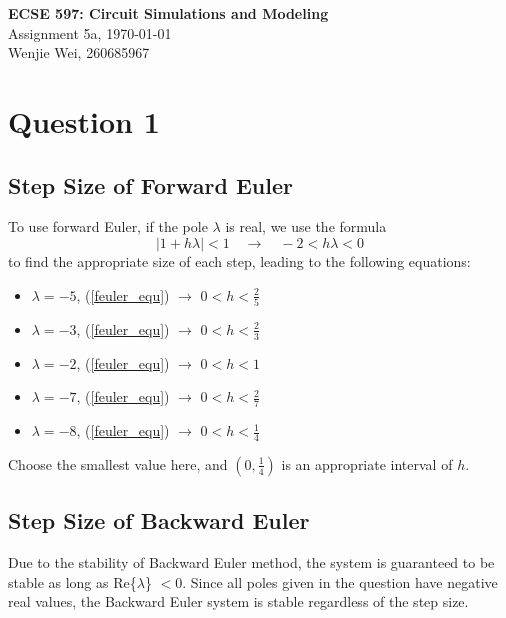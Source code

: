 \documentclass[a4paper,titlepage, 12pt]{article}
\begin{document}
	\sloppy	
	
	\begin{center}
		{\LARGE \bf ECSE 597: Circuit Simulations and Modeling}\\
		{\large Assignment 5a, \quad \today}\\
		{\large Wenjie Wei, 260685967}
	\end{center}

	\section{Question 1}
		\subsection{Step Size of Forward Euler}
			To use forward Euler, if the pole $\lambda$ is real, we use the formula 
			\begin{equation}
				|1 + h\lambda| < 1 \quad \rightarrow \quad -2 < h\lambda < 0
				\label{feuler_equ}
			\end{equation}
			to find the appropriate size of each step, leading to the following equations: 
			
			\begin{itemize}
				\item $\lambda = -5$, (\ref{feuler_equ}) $\rightarrow$ $0 < h < \frac{2}{5}$
								
				\item $\lambda = -3$, (\ref{feuler_equ}) $\rightarrow$ $0 < h < \frac{2}{3}$
				
				\item $\lambda = -2$, (\ref{feuler_equ}) $\rightarrow$ $0 < h < 1$
				
				\item $\lambda = -7$, (\ref{feuler_equ}) $\rightarrow$ $0 < h < \frac{2}{7}$
				
				\item $\lambda = -8$, (\ref{feuler_equ}) $\rightarrow$ $0 < h < \frac{1}{4}$
			\end{itemize}
		
			Choose the smallest value here, and $(0, \frac{1}{4})$ is an appropriate interval of $h$. 
			
		\subsection{Step Size of Backward Euler}
			Due to the stability of Backward Euler method, the system is guaranteed to be stable as long as Re\{$\lambda$\} $< 0$. Since all poles given in the question have negative real values, the Backward Euler system is stable regardless of the step size. 
			
\end{document}
